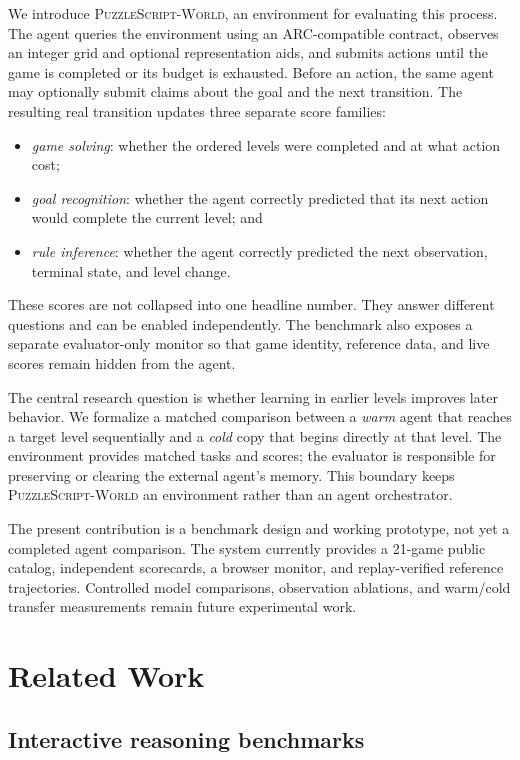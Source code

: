 \documentclass[sigconf,nonacm]{acmart}
\newcommand{\benchmarkname}{\textsc{PuzzleScript-World}}
\begin{document}
We introduce \benchmarkname, an environment for evaluating this process. The
agent queries the environment using an ARC-compatible contract, observes an
integer grid and optional representation aids, and submits actions until the
game is completed or its budget is exhausted. Before an action, the same agent
may optionally submit claims about the goal and the next transition. The
resulting real transition updates three separate score families:

\begin{itemize}
  \item \emph{game solving}: whether the ordered levels were completed and at
  what action cost;
  \item \emph{goal recognition}: whether the agent correctly predicted that
  its next action would complete the current level; and
  \item \emph{rule inference}: whether the agent correctly predicted the next
  observation, terminal state, and level change.
\end{itemize}

These scores are not collapsed into one headline number. They answer different
questions and can be enabled independently. The benchmark also exposes a
separate evaluator-only monitor so that game identity, reference data, and live
scores remain hidden from the agent.

The central research question is whether learning in earlier levels improves
later behavior. We formalize a matched comparison between a \emph{warm} agent
that reaches a target level sequentially and a \emph{cold} copy that begins
directly at that level. The environment provides matched tasks and scores; the
evaluator is responsible for preserving or clearing the external agent's
memory. This boundary keeps \benchmarkname{} an environment rather than an
agent orchestrator.

The present contribution is a benchmark design and working prototype, not yet
a completed agent comparison. The system currently provides a 21-game public
catalog, independent scorecards, a browser monitor, and replay-verified
reference trajectories. Controlled model comparisons, observation ablations,
and warm/cold transfer measurements remain future experimental work.

\section{Related Work}

\subsection{Interactive reasoning benchmarks}
\end{document}
